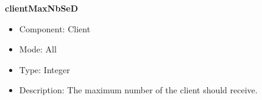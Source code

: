 \begin{description}
\item{\bf{clientMaxNbSeD}}
  \begin{itemize}
  \item Component: Client
  \item Mode: All
  \item Type: Integer
  \item Description: The maximum number of \sed the client should receive.
  \end{itemize}

\end{description}


